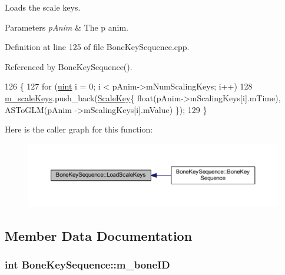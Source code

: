 Loads the scale keys. 


\begin{DoxyParams}{Parameters}
{\em p\+Anim} & The p anim.\\
\hline
\end{DoxyParams}


Definition at line 125 of file Bone\+Key\+Sequence.\+cpp.



Referenced by Bone\+Key\+Sequence().


\begin{DoxyCode}
126 \{
127   \textcolor{keywordflow}{for} (\hyperlink{_types_8h_a4f5fce8c1ef282264f9214809524d836}{uint} i = 0; i < pAnim->mNumScalingKeys; i++)
128       \hyperlink{class_bone_key_sequence_a9a1a5986127adf2f67411d8802463c36}{m\_scaleKeys}.push\_back(\hyperlink{struct_scale_key}{ScaleKey}\{ float(pAnim->mScalingKeys[i].mTime), ASToGLM(pAnim
      ->mScalingKeys[i].mValue) \});
129 \}\end{DoxyCode}


Here is the caller graph for this function\+:\nopagebreak
\begin{figure}[H]
\begin{center}
\leavevmode
\includegraphics[width=350pt]{class_bone_key_sequence_af6d9f85bb507d3712d9805b3a5a05421_icgraph}
\end{center}
\end{figure}




\subsection{Member Data Documentation}
\subsubsection[{\texorpdfstring{m\+\_\+bone\+ID}{m_boneID}}]{\setlength{\rightskip}{0pt plus 5cm}int Bone\+Key\+Sequence\+::m\+\_\+bone\+ID\hspace{0.3cm}{\ttfamily [private]}}\hypertarget{class_bone_key_sequence_a3479ae87f50df83ca145080406a1c3b8}{}\label{class_bone_key_sequence_a3479ae87f50df83ca145080406a1c3b8}


